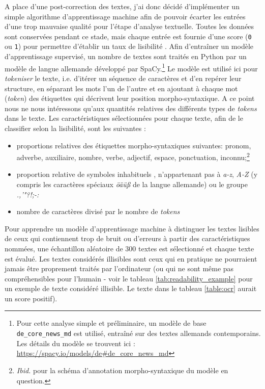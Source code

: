 \documentclass[a4paper,twoside,12pt]{article}
\begin{document}
A place d'une post-correction des textes, j'ai donc décidé d'implémenter un simple algorithme d'apprentissage machine afin de pouvoir écarter les entrées d'une trop mauvaise qualité pour l'étape d'analyse textuelle. Toutes les données sont conservées pendant ce stade, mais chaque entrée est fournie d'une score (\texttt{0} ou \texttt{1}) pour permettre d'établir un taux de \og lisibilité \fg{}. Afin d'entraîner un modèle d'apprentissage supervisé, un nombre de textes sont traités en Python par un modèle de langue allemande développé par SpaCy.\footnote{Pour cette analyse simple et préliminaire, un modèle de base \texttt{de\_core\_news\_md} est utilisé, entraîné sur des textes allemands contemporains. Les détails du modèle se trouvent ici : \url{https://spacy.io/models/de\#de\_core\_news\_md}\label{de_core_news}} Le modèle est utilisé ici pour \textit{tokeniser} le texte, i.e. d'itérer un séquence de caractères et d'en repérer leur structure, en séparant les mots l'un de l'autre et en ajoutant à chaque mot (\textit{token}) des étiquettes qui décrivent leur position morpho-syntaxique. A ce point nous ne nous intéressons qu'aux quantités relatives des différents types de \textit{tokens} dans le texte. Les caractéristiques sélectionnées pour chaque texte, afin de le classifier selon la lisibilité, sont les suivantes :
\vspace{1ex}
\begin{itemize}[label=$\bullet$]
    \item proportions relatives des étiquettes morpho-syntaxiques suivantes: pronom, adverbe, auxiliaire, nombre, verbe, adjectif, espace, ponctuation, inconnu;\footnote{\textit{Ibid.} pour la schéma d'annotation morpho-syntaxique du modèle en question.}
    \item proportion relative de symboles \og inhabituels \fg{}, n'appartenant pas à \textit{a-z}, \textit{A-Z} (y compris les caractères spéciaux \textit{öäüß} de la langue allemande) ou le groupe \mbox{\textit{.,'"?!;-:}}
    \item nombre de caractères divisé par le nombre de \textit{tokens}
\end{itemize}
\vspace{2ex}

Pour apprendre un modèle d'apprentissage machine à distinguer les textes lisibles de ceux qui contiennent trop de bruit ou d'erreurs à partir des caractéristiques nommées, une échantillon aléatoire de 300 textes est sélectionné et chaque texte est évalué. Les textes considérés illisibles sont ceux qui en pratique ne pourraient jamais être proprement traités par l'ordinateur (ou qui ne sont même pas compréhensibles pour l'humain - voir le tableau \ref{tab:readability_example} pour un exemple de texte considéré illisible. Le texte dans le tableau \ref{table:ocr} aurait un score positif).
\end{document}
